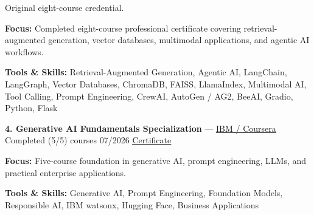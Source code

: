 \documentclass[9pt,letterpaper]{extarticle}
\begin{document}
{\small Original eight-course credential.\par}
\textbf{Focus:} Completed eight-course professional certificate covering retrieval-augmented generation, vector databases, multimodal applications, and agentic AI workflows.\par
{\small\textbf{Tools \& Skills:} Retrieval-Augmented Generation, Agentic AI, LangChain, LangGraph, Vector Databases, ChromaDB, FAISS, LlamaIndex, Multimodal AI, Tool Calling, Prompt Engineering, CrewAI, AutoGen / AG2, BeeAI, Gradio, Python, Flask\par}
\vspace{2pt}
\noindent\textbf{4. Generative AI Fundamentals Specialization} {\small --- \textcolor{blue}{\underline{\href{https://coursera.org/verify/specialization/IPQKDOHF3IV2}{IBM / Coursera}}} \textbar{} Completed (5/5) courses \textbar{} 07/2026 \textbar{} \textcolor{blue}{\underline{\href{https://waseemraza844.github.io/portfolio/certificates/genai/ibm-genai-fundamentals/ibm-genai-fundamentals.pdf}{Certificate}}}}\par
\textbf{Focus:} Five-course foundation in generative AI, prompt engineering, LLMs, and practical enterprise applications.\par
{\small\textbf{Tools \& Skills:} Generative AI, Prompt Engineering, Foundation Models, Responsible AI, IBM watsonx, Hugging Face, Business Applications\par}
\vspace{2pt}
\end{document}
